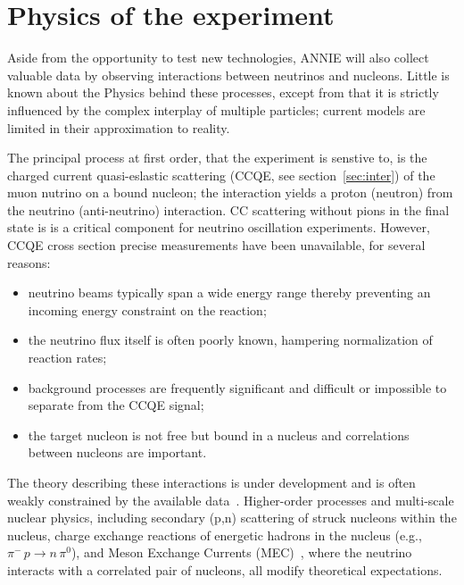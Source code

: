  \section{Physics of the experiment}
 \label{sec:phys}

 Aside from the opportunity to test new technologies, ANNIE will also collect valuable data by observing %
 interactions between neutrinos and nucleons.
 Little is known about the Physics behind these processes, except from that it is strictly influenced by the %
 complex interplay of multiple particles; current models are limited in their approximation to reality.

 The principal process at first order, that the experiment is senstive to, is the charged current quasi-eslastic %
 scattering (CCQE, see section~\ref{sec:inter}) of the muon nutrino on a bound nucleon; the interaction %
 yields a proton (neutron) from the neutrino (anti-neutrino) interaction.
 CC scattering without pions in the final state is is a critical component for neutrino oscillation experiments.
 However, CCQE cross section precise measurements have been unavailable, for several reasons:
 \begin{itemize}
   \item neutrino beams typically span a wide energy range thereby preventing an incoming energy constraint on the %
     reaction;
   \item the neutrino flux itself is often poorly known, hampering normalization of reaction rates;
   \item background processes are frequently significant and difficult or impossible to separate from %
     the CCQE signal;
   \item the target nucleon is not free but bound in a nucleus and correlations between nucleons are important.
 \end{itemize}
 
 The theory describing these interactions is under development and is often weakly constrained %
 by the available data~\cite{Katori2013}.
 Higher-order processes and multi-scale nuclear physics, including secondary (p,n) scattering %
 of struck nucleons within the nucleus, charge exchange reactions of energetic hadrons %
 in the nucleus (e.g., $\pi^- \, p\rightarrow n \, \pi^0$), and Meson Exchange Currents (MEC)~\cite{Sobczyk2012}, %
 where the neutrino interacts with a correlated pair of nucleons, all modify theoretical expectations.


